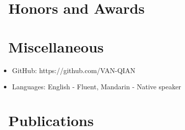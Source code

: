 \documentclass{resume}
\begin{document}
\section{\faHeartO\ Honors and Awards}

\section{\faInfo\ Miscellaneous}
\begin{itemize}[parsep=0.5ex]
  \item GitHub: https://github.com/VAN-QIAN
  \item Languages: English - Fluent, Mandarin - Native speaker
\end{itemize}

\section{\faInfo\ Publications}
% 


\end{document}
